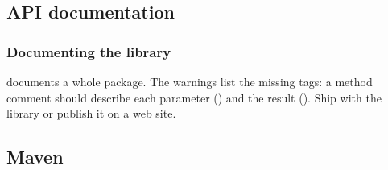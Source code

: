 \documentclass[aspectratio=169,10pt,compress]{beamer}
\begin{document}
\subsection[javadoc]{API documentation}




\begin{frame}[t,fragile] \frametitle{Documenting the library}

  \vspace{0.1em}
  \small
   documents a whole package. The warnings list the missing tags: a method comment should
  describe each parameter () and the result (). Ship  with the library or publish it on a web site.
\end{frame}


\subsection[Maven]{Maven}
\end{document}
